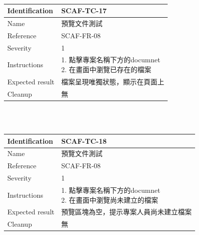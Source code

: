 \documentclass{report}
\begin{document}
\newline
\\
\begin{tabularx}{\textwidth}{
  |p{}%
  |p{}|%
  }
  \hline
  \centering Identification &  SCAF-TC-17 \\
  \hline
  \centering Name & 預覽文件測試 \\
  \hline
  \centering Reference & SCAF-FR-08 \\
  \hline
  \centering Severity & 1 \\
  \hline
 \centering Instructions & 
  \makecell[l]{
    1. 點擊專案名稱下方的documnet \\
    2. 在畫面中瀏覽已存在的檔案
  }\\
  \hline
  \centering Expected result & 檔案呈現唯獨狀態，顯示在頁面上 \\
  \hline
  \centering Cleanup & 無 \\
  \hline
\end{tabularx}
\\
\newline
\\
\begin{tabularx}{\textwidth}{
  |p{}%
  |p{}|%
  }
  \hline
  \centering Identification &  SCAF-TC-18 \\
  \hline
  \centering Name & 預覽文件測試 \\
  \hline
  \centering Reference & SCAF-FR-08 \\
  \hline
  \centering Severity & 1 \\
  \hline
 \centering Instructions & 
  \makecell[l]{
    1. 點擊專案名稱下方的documnet \\
    2. 在畫面中瀏覽尚未建立的檔案
  }\\
  \hline
  \centering Expected result & 預覽區塊為空，提示專案人員尚未建立檔案 \\
  \hline
  \centering Cleanup & 無 \\
  \hline
\end{tabularx}
\\
\newline
\\
\end{document}
